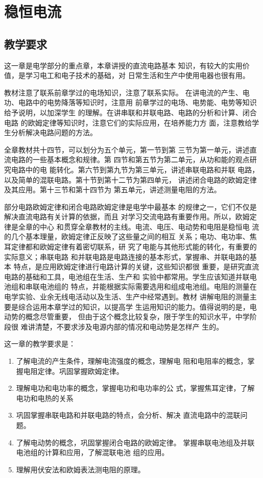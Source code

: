 \chapter{稳恒电流}
\section{教学要求}
这一章是电学部分的重点章，本章讲授的直流电路基本
知识，有较大的实用价值，是学习电工和电子技术的基础，对
日常生活和生产中使用电器也很有用。

教材注意了联系前章学过的电场知识，注意了联系实际。
在讲电流的产生、电功、电路中的电势降落等知识时，注意用
前章学过的电场、电势能、电势等知识给予说明，以加深学生
的理解。在讲串联和并联电路、电路的分析和计算、闭合电路
的欧姆定律等知识时，注意它们的实际应用，在培养能力方
面，注意教给学生分析解决电路问题的方法。

全章教材共十四节，可以划分为五个单元，第一节到第
三节为第一单元，讲述直流电路的一些基本概念和规律。第
四节和第五节为第二单元，从功和能的观点研究电路中的电
能转化。第六节到第九节为第三单元，讲述串联电路和并联
电路，以及简单的混联电路。第十节到第十二节为第四单元，
讲述闭合电路的欧姆定律及其应用。第十三节和第十四节为
第五单元，讲述测量电阻的方法。

部分电路欧姆定律和闭合电路欧姆定律是电学中最基本
的规律之一，它们不仅是解决直流电路有关计算的依据，而且
对学习交流电路有重要作用。所以，欧姆定律是全章的中心
和贯穿全章教材的主线。电流、电压、电动势和电阻是稳恒电
流的几个基本理量，欧姆定律正反映了这些量之间的相互
关系；电功、电功率、焦耳定律都和欧姆定律有着密切联系，研
究了电能与其他形式能的转化，有重要的实际意义；串联电路
和并联电路是电路连接的基本形式，掌握串、并联电路的基本
特点，是应用欧姆定律进行电路计算的关键，这些知识都很
重要，是研究直流电路的基础和工具，电池组在生活、生产和
实验中都常用。学生应该知道并联电池组和串联电池组的
特点，并能根据实际需要选用和组成电池组。电阻的测量在
电学实验、业余无线电活动以及生活、生产中经常遇到。教材
讲解电阻的测量主要是综合运用本章学过的知识，以提高学
生运用知识的能力。值得说明的是，电动势的概念尽管重要，
但由于这个概念比较复杂，限于学生的知识水平，中学阶段很
难讲清楚，不要求涉及电源内部的情况和电动势是怎样产
生的。

这一章的教学要求是：
\begin{enumerate}
\item 了解电流的产生条件，理解电流强度的概念，理解电
阻和电阻率的概念，掌握电阻定律。巩固掌握欧姆定律。
\item 理解电功和电功率的概念，掌握电功和电功率的公
式，掌握焦耳定律，了解电功和电热的关系
\item 巩固掌握串联电路和并联电路的特点，会分析、解决
直流电路中的混联问题。
\item 了解电动势的概念，巩固掌握闭合电路的欧姆定律。
掌握串联电池组及并联电池组的计算和应用，了解混联电池
组的应用。
\item 理解用伏安法和欧姆表法测电阻的原理。
\end{enumerate}


